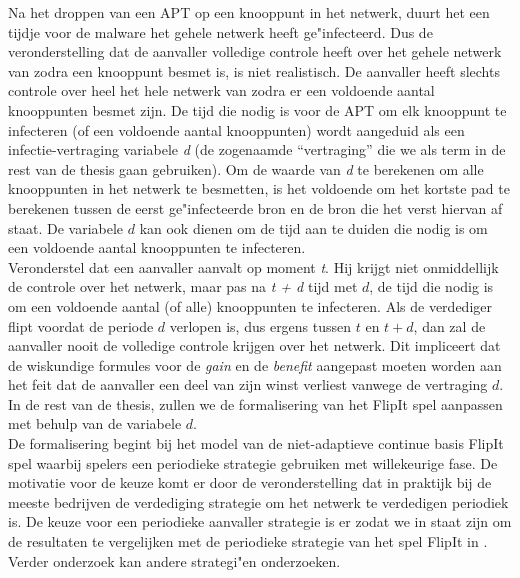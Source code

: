 \documentclass[master=cws, masteroption=vs,english]{kulemt}
\begin{document}
\begin{abstract*}
Na het droppen van een APT op een knooppunt in het netwerk, duurt het een tijdje voor de malware het gehele netwerk heeft ge"infecteerd. Dus de veronderstelling dat de aanvaller volledige controle heeft over het gehele netwerk van zodra een knooppunt besmet is, is niet realistisch. De aanvaller heeft slechts controle over heel het hele netwerk van zodra er een voldoende aantal knooppunten besmet zijn.
De tijd die nodig is voor de APT om elk knooppunt te infecteren (of een voldoende aantal knooppunten) wordt
aangeduid als een infectie-vertraging variabele \textit{d} (de zogenaamde ``vertraging'' die we als term in de rest van de thesis gaan gebruiken). Om de waarde van \textit{d} te berekenen om alle knooppunten in het netwerk te besmetten, is het voldoende om het kortste pad te berekenen tussen de eerst ge"infecteerde bron en de bron die het verst hiervan af staat. De variabele $ d $ kan ook dienen om de tijd aan te duiden die nodig is om een voldoende aantal knooppunten te infecteren.\\

Veronderstel dat een aanvaller aanvalt op moment \textit {t}. Hij krijgt niet onmiddellijk de controle over het netwerk, maar pas na \textit {t + d} tijd met $ d $, de tijd die nodig is om een voldoende aantal (of alle) knooppunten te infecteren. Als de verdediger flipt voordat de periode $d$ verlopen is, dus ergens tussen $t$ en $t+d$, dan zal de aanvaller nooit de volledige controle krijgen over het netwerk. Dit impliceert dat de wiskundige formules voor de \textit{gain} en de \textit{benefit} aangepast moeten worden aan het feit dat de aanvaller een deel van zijn winst verliest vanwege de vertraging $d$. In de rest van de thesis, zullen we de formalisering van het FlipIt spel aanpassen met behulp van de variabele $ d $. \\

De formalisering begint bij het model van de niet-adaptieve continue basis FlipIt spel waarbij spelers een periodieke strategie gebruiken met willekeurige fase. De motivatie voor de keuze komt er door de veronderstelling dat in praktijk bij de meeste bedrijven de verdediging strategie om het netwerk te verdedigen periodiek is. De keuze voor een periodieke aanvaller strategie is er zodat we in staat zijn om de resultaten te vergelijken met de periodieke strategie van het spel FlipIt in \cite{Flipit}. %
Verder onderzoek kan andere strategi"en onderzoeken. \\


\end{abstract*}
\end{document}
